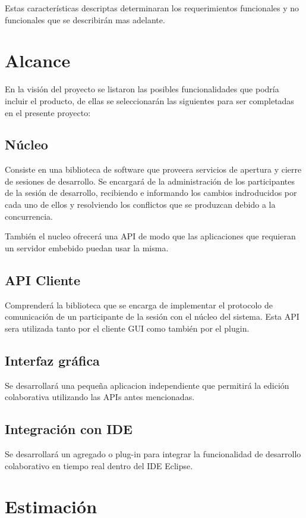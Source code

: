 \documentclass[12pt,a4paper]{article}
\begin{document}
Estas características descriptas determinaran los requerimientos funcionales y no funcionales que se describirán mas adelante.

	\section{Alcance}
   En la visión del proyecto se listaron las posibles funcionalidades que podría incluir el producto, de ellas se seleccionarán las siguientes para ser completadas en el presente proyecto:
   
	\subsection{Núcleo}
	Consiste en una biblioteca de software que proveera servicios de apertura y cierre de sesiones de desarrollo. Se encargará de la administración de los participantes de la sesión de desarrollo, recibiendo e informando los cambios indroducidos por cada uno de ellos y resolviendo los conflictos que se produzcan debido a la concurrencia.
	
	También el nucleo ofrecerá una API de modo que las aplicaciones que requieran un servidor embebido puedan usar la misma.

	\subsection{API Cliente}
	Comprenderá la biblioteca que se encarga de implementar el protocolo de comunicación de un participante de la sesión con el núcleo del sistema. Esta API sera utilizada tanto por el cliente GUI como también por el plugin.

	\subsection{Interfaz gráfica}
	Se desarrollará una pequeña aplicacion independiente que permitirá la edición colaborativa utilizando las APIs antes mencionadas.

	\subsection{Integración con IDE}
	Se desarrollará un agregado o plug-in para integrar la funcionalidad de desarrollo colaborativo en tiempo real dentro del IDE Eclipse.

	\section{Estimación}
\end{document}
